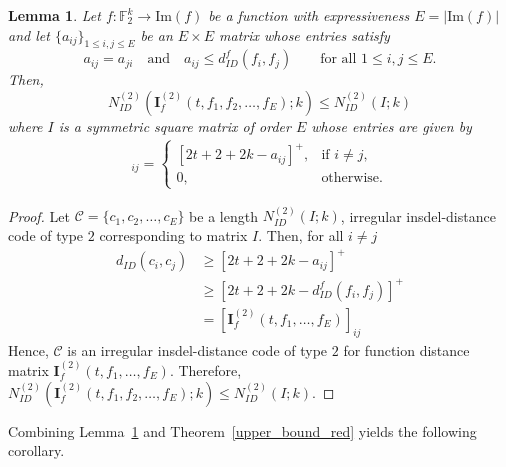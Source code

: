 \documentclass[11 pt]{article}
\numberwithin{equation}{section}
\newtheorem{lemma}[theorem]{Lemma}
\begin{document}
        \begin{lemma}\label{lower_bound_function_distance}
            Let $f: \mathbb{F}_2^k \rightarrow \mathrm{Im}(f)$ be a function with expressiveness $E = |\mathrm{Im}(f)|$ and let $\{a_{ij}\}_{1 \leq i, j \leq E}$ be an $E \times E$ matrix whose entries satisfy
            \[
            a_{ij} = a_{ji} \quad \text{and} \quad 
            a_{ij} \leq d^{f}_{ID}(f_i, f_j) 
            \qquad \text{for all } 1 \leq i, j \leq E.
            \]
            Then,
            $$N_{ID}^{(2)}(\bm{I}_f^{(2)}(t, f_1, f_2, \ldots, f_E);k) \leq N_{ID}^{(2)}(I;k)$$
            where $I$ is a symmetric square matrix of order $E$ whose entries are given by 
            \begin{align*}
             [{\mathbf{I}}]_{ij} =
            \begin{cases} 
                [2t + 2 + 2k - a_{ij}]^{+}, & \text{if } i \neq j, \\ 
                0, & \text{otherwise}.
            \end{cases}
            \end{align*}
        \end{lemma}
        \begin{proof}
            Let $\mathcal{C} = \{ c_1, c_2, \ldots, c_E\}$ be a length $N_{ID}^{(2)}(I;k)$, irregular insdel-distance code of type $2$ corresponding to matrix $I$. Then, for all $i \neq j$
            \begin{align*}
                d_{ID}(c_i, c_j) &\geq [2t + 2+ 2k - a_{ij}]^+\\
                                     & \geq [2t + 2+ 2k - d_{ID}^f(f_i, f_j)]^+\\
                                     & = [\boldsymbol{I}_f^{(2)}( t, f_1, \dots, f_E)]_{ij}
            \end{align*}
            Hence, $\mathcal{C}$ is an irregular insdel-distance code of type $2$ for function distance matrix ${\bm{I}_f^{(2)}}(t,f_1,\ldots, f_E)$.
            Therefore, $N_{ID}^{(2)}(\bm{I}_f^{(2)}(t, f_1, f_2, \ldots, f_E);k) \leq N_{ID}^{(2)}(I;k).$
        \end{proof}
        
        Combining Lemma~\ref{lower_bound_function_distance} and Theorem~\ref{upper_bound_red} yields the following corollary.
        
\end{document}
